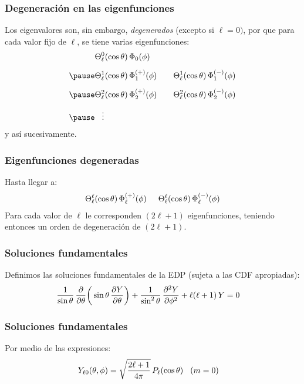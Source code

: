 \documentclass[12pt]{beamer}
\begin{document}
\begin{frame}
\frametitle{Degeneración en las eigenfunciones}
Los eigenvalores son, sin embargo, \pause \emph{degenerados} (excepto si $\ell = 0)$, \pause por que para cada valor fijo de $\ell$, se tiene varias eigenfunciones:
\pause
\begin{eqnarray*}
\begin{aligned}
&\Theta_{\ell}^{0} (\cos \theta) \, \Phi_{0} (\phi) \\[0.5em] \pause
&\Theta_{\ell}^{1} (\cos \theta) \, \Phi_{1}^{(+)} (\phi) \hspace{0.7cm} \Theta_{\ell}^{1} (\cos \theta) \, \Phi_{1}^{(-)} (\phi) \\[0.5em] \pause
&\Theta_{\ell}^{2} (\cos \theta) \, \Phi_{2}^{(+)} (\phi) \hspace{0.7cm} \Theta_{\ell}^{2} (\cos \theta) \, \Phi_{2}^{(-)} (\phi) \\[0.5em] \pause
&{} \hspace{0.3cm} \vdots
\end{aligned}
\end{eqnarray*}
y así sucesivamente.
\end{frame}
\begin{frame}
\frametitle{Eigenfunciones degeneradas}
Hasta llegar a:
\pause
\begin{align*}
\Theta_{\ell}^{\ell} (\cos \theta) \, \Phi_{\ell}^{(+)} (\phi) \hspace{0.5cm} \Theta_{\ell}^{\ell} (\cos \theta) \, \Phi_{\ell}^{(-)} (\phi)
\end{align*}
\pause
Para cada valor de $\ell$ le corresponden $(2 \ell + 1)$ eigenfunciones, teniendo entonces un orden de degeneración de $(2 \ell + 1)$.
\end{frame}
\begin{frame}
\frametitle{Soluciones fundamentales}
Definimos las soluciones fundamentales de la EDP (sujeta a las CDF apropiadas):
\pause
\begin{align*}
\dfrac{1}{\sin \theta} \, \pdv{\theta} \bigg( \sin \theta \, \pdv{Y}{\theta} \bigg) &+ \dfrac{1}{\sin^{2} \theta} \, \pdv[2]{Y}{\phi} + \ell (\ell + 1) \, Y = 0
\end{align*}
\end{frame}
\begin{frame}
\frametitle{Soluciones fundamentales}
Por medio de las expresiones:
\pause
\begin{eqnarray*}
&Y_{\ell 0} (\theta, \phi) = \sqrt{\dfrac{2 \ell + 1}{4 \pi}} \, P_{\ell} (\cos \theta) \hspace{0.3cm} (m = 0)
\end{eqnarray*}
\end{frame}
\end{document}

